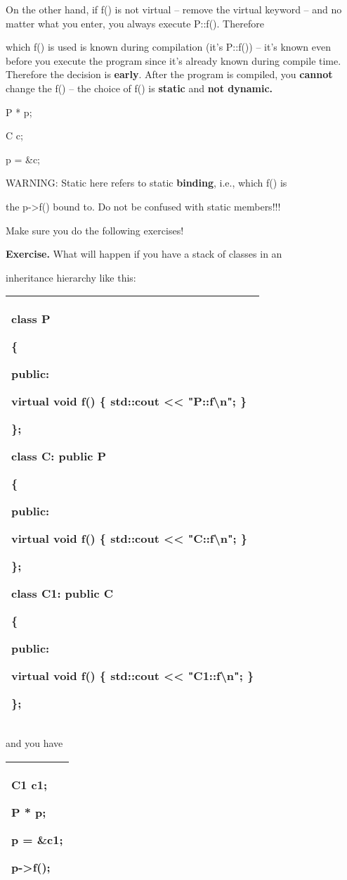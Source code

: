 \documentclass[
]{article}
\begin{document}
On the other hand, if f() is not virtual -- remove the virtual keyword
-- and no matter what you enter, you always execute P::f(). Therefore

which f() is used is known during compilation (it's P::f()) -- it's
known even before you execute the program since it's already known
during compile time. Therefore the decision is \textbf{early}. After the
program is compiled, you \textbf{cannot }change the f() -- the choice of
f() is \textbf{static }and \textbf{not dynamic.}

\textbf{}P * p;

C c;

p = \&c;

WARNING: Static here refers to static \textbf{binding}, i.e., which f()
is

the p-\textgreater f() bound to. Do not be confused with static
members!!!

Make sure you do the following exercises!

\textbf{Exercise. }What will happen if you have a stack of classes in an

inheritance hierarchy like this:

\begin{longtable}[]{@{}l@{}}
\toprule
\endhead
\begin{minipage}[t]{0.97\columnwidth}\raggedright
class P

\{

public:

virtual void f() \{ std::cout \textless\textless{}
"P::f\textbackslash n"; \}

\};

class C: public P

\{

public:

virtual void f() \{ std::cout \textless\textless{}
"C::f\textbackslash n"; \}

\};

class C1: public C

\{

public:

virtual void f() \{ std::cout \textless\textless{}
"C1::f\textbackslash n"; \}

\};\strut
\end{minipage}\tabularnewline
\bottomrule
\end{longtable}

and you have

\begin{longtable}[]{@{}l@{}}
\toprule
\endhead
\begin{minipage}[t]{0.97\columnwidth}\raggedright
C1 c1;

P * p;

p = \&c1;

p-\textgreater f();\strut
\end{minipage}\tabularnewline
\bottomrule
\end{longtable}
\end{document}
